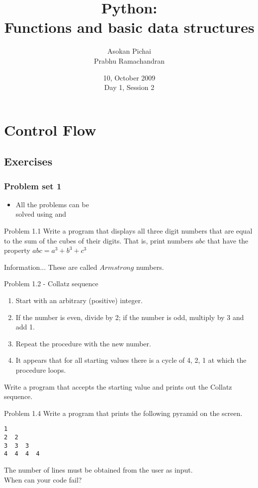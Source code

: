 \documentclass[14pt,compress]{beamer}
\title[Basic Python]{Python:\\Functions and basic data structures}
\author[FOSSEE Team] {Asokan Pichai\\Prabhu Ramachandran}
\institute[IIT Bombay] {Department of Aerospace Engineering\\IIT Bombay}
\date[] {10, October 2009\\Day 1, Session 2}
\newcounter{time}
\newcommand{\inctime}[1]{\addtocounter{time}{#1}{\tiny \thetime\ m}}
\newcommand{\kwrd}[1]{ \texttt{\textbf{\color{blue}{#1}}}  }
\begin{document}
\begin{frame}
  \titlepage
\end{frame}

\section{Control Flow}

\subsection{Exercises}
\begin{frame}
  \frametitle{Problem set 1}
  \begin{itemize}
    \item All the problems can be\\
      solved using \kwrd{if} and \kwrd{while} 
  \end{itemize}
\end{frame}

\begin{frame}{Problem 1.1}
  Write a program that displays all three digit numbers that are equal to the sum of the cubes of their digits. That is, print numbers $abc$ that have the property $abc = a^3 + b^3 + c^3$\\
\begin{block}
{Information...}
These are called $Armstrong$ numbers.
\end{block}
\end{frame}
  
\begin{frame}{Problem 1.2 - Collatz sequence}
\begin{enumerate}
  \item Start with an arbitrary (positive) integer. 
  \item If the number is even, divide by 2; if the number is odd, multiply by 3 and add 1.
  \item Repeat the procedure with the new number.
  \item It appears that for all starting values there is a cycle of 4, 2, 1 at which the procedure loops.
\end{enumerate}
    Write a program that accepts the starting value and prints out the Collatz sequence.

\end{frame}

\begin{frame}[fragile]{Problem 1.4}
  Write a program that prints the following pyramid on the screen. 
  \begin{lstlisting}
1
2  2
3  3  3
4  4  4  4
  \end{lstlisting}
The number of lines must be obtained from the user as input.\\
\pause
When can your code fail?
\only<2->{\inctime{20}}
\end{frame}
\end{document}
